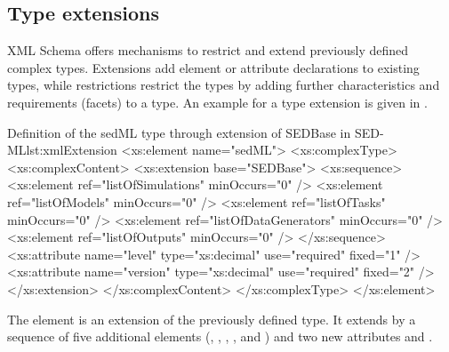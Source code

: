 \subsection{Type extensions}
XML Schema offers mechanisms to restrict and extend previously defined complex types. 
Extensions add element or attribute declarations to existing types, while restrictions restrict the types by adding further characteristics and requirements (facets) to a type. 
An example for a type extension is given in .
%
\begin{myXmlLst}{Definition of the sedML type through extension of SEDBase in SED-ML}{lst:xmlExtension}
	<xs:element name="sedML">
		<xs:complexType>
			<xs:complexContent>
				<xs:extension base="SEDBase">
					<xs:sequence>
						<xs:element ref="listOfSimulations" minOccurs="0" />
						<xs:element ref="listOfModels" minOccurs="0" />
						<xs:element ref="listOfTasks" minOccurs="0" />
						<xs:element ref="listOfDataGenerators" minOccurs="0" />
						<xs:element ref="listOfOutputs" minOccurs="0" />
					</xs:sequence>
					<xs:attribute name="level" type="xs:decimal" use="required"
						fixed="1" />
					<xs:attribute name="version" type="xs:decimal" use="required"
						fixed="2" />
				</xs:extension>
			</xs:complexContent>
		</xs:complexType>
	</xs:element>
\end{myXmlLst}
%
The  element is an extension of the previously defined  type. It extends  by a sequence of five additional elements (, , , , and ) and two new attributes  and .






